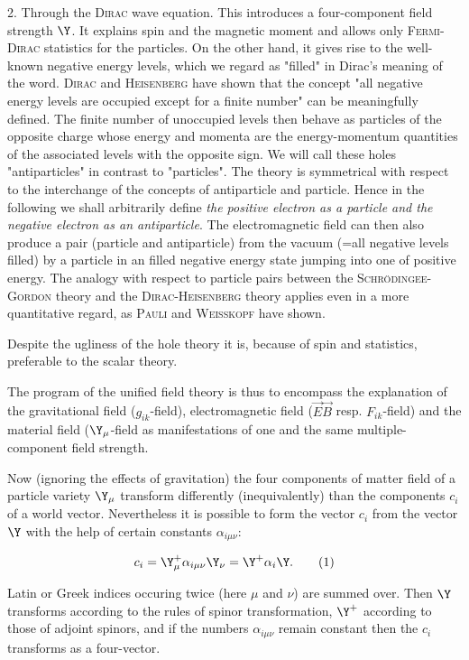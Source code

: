 \documentclass{article}
\newcommand{\nequ}[2]{
\begin{align*}
#1
\tag{#2}
\end{align*}
}
\begin{document}
2. Through the \textsc{Dirac} wave equation. This introduces a four-component field strength $\Y$. It explains spin and the magnetic moment and allows only \textsc{Fermi-Dirac} statistics for the particles. On the other hand, it gives rise to the well-known negative energy levels, which we regard as "filled" in Dirac's meaning of the word. \textsc{Dirac} and \textsc{Heisenberg}\cite{3} have shown that the concept "all negative energy levels are occupied except for a finite number" can be meaningfully defined. The finite number of unoccupied levels then behave as particles of the opposite charge whose energy and momenta are the energy-momentum quantities of the associated levels with the opposite sign. We will call these holes "antiparticles" in contrast to "particles". The theory is symmetrical with respect to the interchange of the concepts of antiparticle and particle. Hence in the following we shall arbitrarily define \textit{the positive electron as a particle and the negative electron as an antiparticle}. The electromagnetic field can then also produce a pair (particle and antiparticle) from the vacuum (=all negative levels filled) by a particle in an filled negative energy state jumping into one of positive energy. The analogy with respect to particle pairs between the \textsc{Schr\"odingee-Gordon} theory and the \textsc{Dirac-Heisenberg} theory applies even in a more quantitative regard, as \textsc{Pauli} and \textsc{Weisskopf} have shown\cite{2}.

Despite the ugliness of the hole theory it is, because of spin and statistics, preferable to the scalar theory.

The program of the unified field theory is thus to encompass the explanation of the gravitational field ($g_{ik}$-field), electromagnetic field ($\vec{E}\vec{B}$ resp. $F_{ik}$-field) and the material field ($\Y_\mu$-field as manifestations of one and the same multiple-component field strength.

Now (ignoring the effects of gravitation) the four components of matter field of a particle variety $\Y_\mu$ transform differently (inequivalently) than the components $c_i$ of a world vector\cite{4}. Nevertheless it is possible to form the vector $c_i$ from the vector $\Y$ with the help of certain constants $\alpha_{i\mu\nu}$:
\nequ{
c_i = \Y_\mu^+ \alpha_{i\mu\nu} \Y_\nu = \Y^+\alpha_i\Y.
}{1}
Latin or Greek indices occuring twice (here $\mu$ and $\nu$) are summed over. Then $\Y$ transforms according to the rules of spinor transformation, $\Y^+$ according to those of adjoint spinors, and if the numbers $\alpha_{i\mu\nu}$ remain constant then the $c_i$ transforms as a four-vector\cite{4}.
\end{document}
